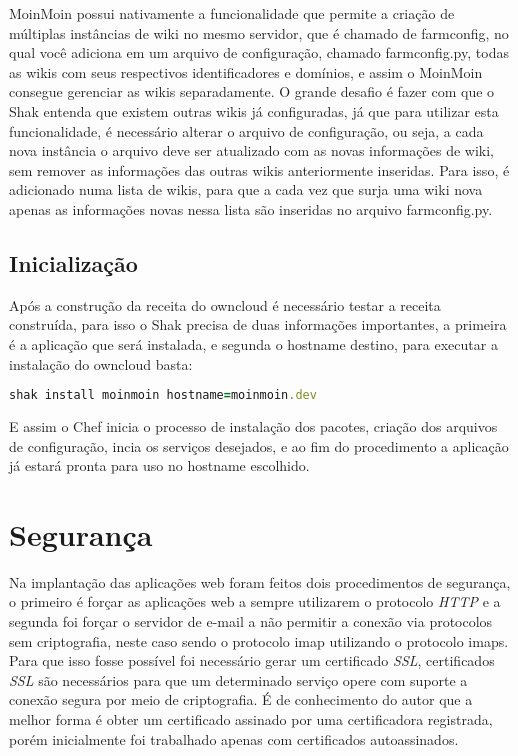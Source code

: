 MoinMoin possui nativamente a funcionalidade
que permite a criação de múltiplas instâncias de wiki no mesmo servidor,
que é chamado de farmconfig, no qual você adiciona em um arquivo de configuração,
chamado farmconfig.py, todas as wikis com seus respectivos identificadores e domínios, e assim
o MoinMoin consegue gerenciar as wikis separadamente. O grande desafio é fazer
com que o Shak entenda que existem outras wikis já configuradas, já que para
utilizar esta funcionalidade,
é necessário alterar o arquivo de configuração, ou seja, a cada nova instância
o arquivo deve ser atualizado com as novas informações de wiki, sem remover as
informações das outras wikis anteriormente inseridas. Para isso, é adicionado
numa lista de wikis, para que a cada vez que surja uma wiki nova apenas as
informações novas nessa lista são inseridas no arquivo farmconfig.py.

\subsection{Inicialização}

Após a construção da receita do owncloud é necessário testar a receita construída,
para isso o Shak precisa de duas informações importantes, a primeira é a aplicação
que será instalada, e segunda o hostname destino, para executar a instalação
do owncloud basta:

\begin{lstlisting}[language=Ruby,label=dice_index,caption={Exemplo de execução de instalação do owncloud com shak}]
shak install moinmoin hostname=moinmoin.dev
\end{lstlisting}

E assim o Chef inicia o processo de instalação dos pacotes, criação dos arquivos
de configuração, incia os serviços desejados, e ao fim do procedimento a aplicação
já estará pronta para uso no hostname escolhido.

\section{Segurança}
\label{sub:seguranca}

Na implantação das aplicações web foram feitos dois procedimentos de segurança, o primeiro
é forçar as aplicações web a sempre utilizarem o protocolo \textit{HTTP} e a segunda foi forçar o
servidor de e-mail a não permitir a conexão via protocolos sem criptografia, neste
caso sendo o protocolo imap utilizando o protocolo imaps. Para que isso fosse possível
foi necessário gerar um certificado \textit{SSL}, certificados \textit{SSL} são necessários para
que um determinado serviço opere com suporte a conexão segura por meio de criptografia.
É de conhecimento do autor que a melhor forma é obter um certificado assinado
por uma certificadora registrada, porém inicialmente foi trabalhado apenas com certificados
autoassinados.

